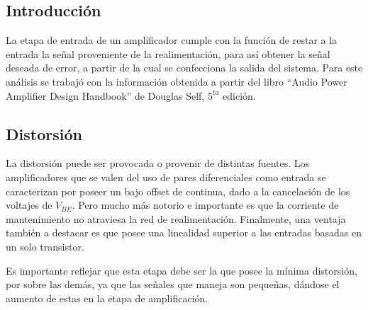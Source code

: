 \subsection{Introducción}

La etapa de entrada de un amplificador cumple con la función de restar a la entrada la señal proveniente de la realimentación, para así obtener la señal deseada de error, a partir de la cual se confecciona la salida del sistema. Para este análisis se trabajó con la información obtenida a partir del libro ``Audio Power Amplifier Design Handbook'' de Douglas Self, $5^{ta}$ edición.

\subsection{Distorsión}

La distorsión puede ser provocada o provenir de distintas fuentes. Los amplificadores que se valen del uso de pares diferenciales como entrada se caracterizan por poseer un bajo offset de continua, dado a la cancelación de los voltajes de $V_{BE}$. Pero mucho más notorio e importante es que la corriente de mantenimiento no atraviesa la red de realimentación. Finalmente, una ventaja también a destacar es que posee una linealidad superior a las entradas basadas en un solo transistor. %

Es importante reflejar que esta etapa debe ser la que posee la mínima distorsión, por sobre las demás, ya que las señales que maneja son pequeñas, dándose el aumento de estas en la etapa de amplificación.    

